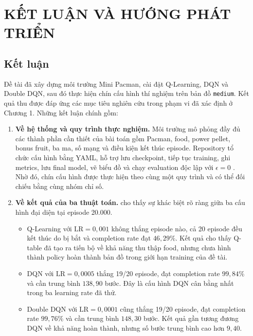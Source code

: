 \section{KẾT LUẬN VÀ HƯỚNG PHÁT TRIỂN}

\subsection{Kết luận}

Đề tài đã xây dựng môi trường Mini Pacman, cài đặt Q-Learning, DQN và Double DQN, sau đó thực hiện chín cấu hình thí nghiệm trên bản đồ \texttt{medium}. Kết quả thu được đáp ứng các mục tiêu nghiên cứu trong phạm vi đã xác định ở Chương 1. Những kết luận chính gồm:

\begin{enumerate}
    \item \textbf{Về hệ thống và quy trình thực nghiệm.} Môi trường mô phỏng đầy đủ các thành phần cần thiết của bài toán gồm Pacman, food, power pellet, bonus fruit, ba ma, số mạng và điều kiện kết thúc episode. Repository tổ chức cấu hình bằng YAML, hỗ trợ lưu checkpoint, tiếp tục training, ghi metrics, lưu final model, vẽ biểu đồ và chạy evaluation độc lập với $\epsilon=0$ \cite{DRLPacmanGitHub}. Nhờ đó, chín cấu hình được thực hiện theo cùng một quy trình và có thể đối chiếu bằng cùng nhóm chỉ số.

    \item \textbf{Về kết quả của ba thuật toán.}  cho thấy sự khác biệt rõ ràng giữa ba cấu hình đại diện tại episode 20.000.
    \begin{itemize}
        \item Q-Learning với $\mathrm{LR}=0{,}001$ không thắng episode nào, cả 20 episode đều kết thúc do bị bắt và completion rate đạt $46{,}29\%$. Kết quả cho thấy Q-table đã tạo ra tiến bộ về khả năng thu thập food, nhưng chưa hình thành policy hoàn thành bản đồ trong giới hạn training của đề tài.

        \item DQN với $\mathrm{LR}=0{,}0005$ thắng 19/20 episode, đạt completion rate $99{,}84\%$ và cần trung bình $138{,}90$ bước. Đây là cấu hình DQN cân bằng nhất trong ba learning rate đã thử.

        \item Double DQN với $\mathrm{LR}=0{,}0001$ cũng thắng 19/20 episode, đạt completion rate $99{,}76\%$ và cần trung bình $148{,}30$ bước. Kết quả gần tương đương DQN về khả năng hoàn thành, nhưng số bước trung bình cao hơn $9{,}40$.
    \end{itemize}


\end{enumerate}
